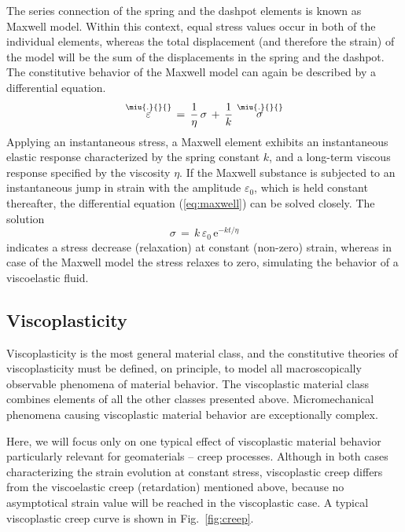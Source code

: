 The series connection of the spring and the dashpot elements is known as Maxwell model. Within this context, equal stress values occur in
both of the individual elements, whereas the total displacement (and therefore the strain) of the model will be the sum of the
displacements in the spring and the dashpot. The constitutive behavior of the Maxwell model can again be described by a differential
equation. 
\begin{equation}
\mathop{\varepsilon}\limits^{\miu{.}{}{}}\,=\,\frac{1}{\eta}\,\sigma\,+\,\frac{1}{k}\,\mathop{\sigma}\limits^{\miu{.}{}{}}
\label{eq:maxwell}
\end{equation}
Applying an instantaneous stress, a Maxwell element exhibits an instantaneous elastic response characterized by the spring constant $k$,
and a long-term viscous response specified by the viscosity $\eta$. If the Maxwell substance is subjected to an instantaneous jump in
strain with the amplitude $\varepsilon_0$, which is held constant thereafter, the differential equation (\ref{eq:maxwell}) can be solved closely.
The solution
\begin{equation}
\sigma\,=\,k\,\varepsilon_0\,\mathrm{e}^{-kt/\eta}
\end{equation}
indicates a stress decrease (relaxation) at constant (non-zero) strain, whereas in case of the Maxwell model the stress relaxes to zero,
simulating the behavior of a viscoelastic fluid.

\subsection{Viscoplasticity}
\label{sec:viscoplast}

Viscoplasticity is the most general material class, and the constitutive theories of viscoplasticity must be defined, on principle, to model all macroscopically observable phenomena of material behavior. The viscoplastic material class combines elements of all the other classes presented above. Micromechanical phenomena causing viscoplastic material behavior are exceptionally complex. 

Here, we will focus only on one typical effect of viscoplastic material behavior particularly relevant for geomaterials -- creep processes. Although in both cases characterizing the strain evolution at constant stress, viscoplastic creep differs from the viscoelastic creep (retardation) mentioned above, because no asymptotical strain value will be reached in the viscoplastic case. A typical viscoplastic creep curve is shown in Fig.~\ref{fig:creep}.

